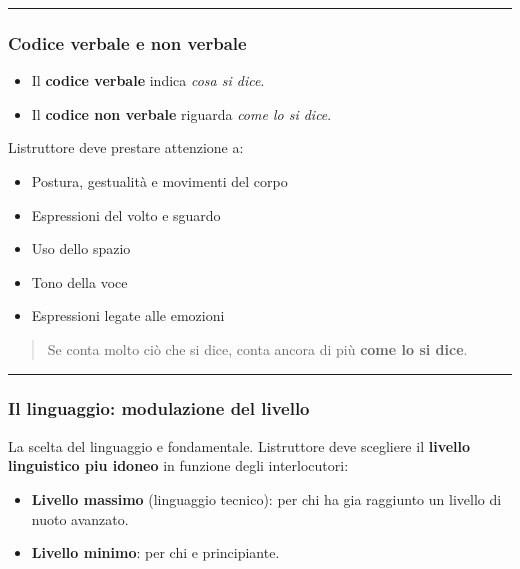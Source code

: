 \documentclass[a4paper,11pt]{article}
\providecommand{\tightlist}{%
  \setlength{\itemsep}{0pt}\setlength{\parskip}{0pt}}
\begin{document}
\begin{center}\rule{0.5\linewidth}{0.5pt}\end{center}

\subsubsection{Codice verbale e non
      verbale}\label{codice-verbale-e-non-verbale}

\begin{itemize}
      \tightlist
      \item
            Il \textbf{codice verbale} indica \emph{cosa si dice}.
      \item
            Il \textbf{codice non verbale} riguarda \emph{come lo si dice}.
\end{itemize}

L\textquotesingle istruttore deve prestare attenzione a:

\begin{itemize}
      \tightlist
      \item
            Postura, gestualità e movimenti del corpo
      \item
            Espressioni del volto e sguardo
      \item
            Uso dello spazio
      \item
            Tono della voce
      \item
            Espressioni legate alle emozioni
\end{itemize}

\begin{quote}
      Se conta molto ciò che si dice, conta ancora di più \textbf{come lo si
            dice}.
\end{quote}

\begin{center}\rule{0.5\linewidth}{0.5pt}\end{center}

\subsubsection{Il linguaggio: modulazione del
      livello}\label{il-linguaggio-modulazione-del-livello}

La scelta del linguaggio e fondamentale. L\textquotesingle istruttore
deve scegliere il \textbf{livello linguistico piu idoneo} in funzione
degli interlocutori:

\begin{itemize}
      \tightlist
      \item
            \textbf{Livello massimo} (linguaggio tecnico): per chi ha gia
            raggiunto un livello di nuoto avanzato.
      \item
            \textbf{Livello minimo}: per chi e principiante.
\end{itemize}
\end{document}
